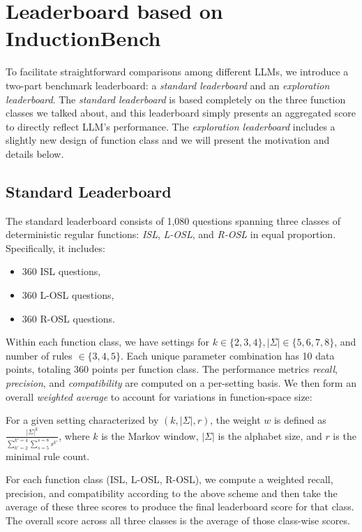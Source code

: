 \section{Leaderboard based on InductionBench}
To facilitate straightforward comparisons among different LLMs, we introduce a two-part benchmark leaderboard: a \emph{standard leaderboard} and an \emph{exploration leaderboard}. The \emph{standard leaderboard} is based completely on the three function classes we talked about, and this leaderboard simply presents an aggregated score to directly reflect LLM's performance. The \emph{exploration leaderboard} includes a slightly new design of function class and we will present the motivation and details below. 

\subsection{Standard Leaderboard}
The standard leaderboard consists of 1,080 questions spanning three classes of deterministic regular functions: \emph{ISL}, \emph{L-OSL}, and \emph{R-OSL} in equal proportion. Specifically, it includes: \begin{itemize}[leftmargin=*, itemsep=1pt] \item 360 ISL questions, \item 360 L-OSL questions, \item 360 R-OSL questions. \end{itemize}

Within each function class, we have settings for $k\in\{2, 3, 4\}, |\Sigma|\in\{5, 6, 7, 8\}$, and number of rules $\in\{3, 4, 5\}$. Each unique parameter combination has 10 data points, totaling 360 points per function class. The performance metrics \emph{recall}, \emph{precision}, and \emph{compatibility} are computed on a per-setting basis. We then form an overall \emph{weighted average} to account for variations in function-space size: 

\begin{definition}
For a given setting characterized by $(k, |\Sigma|, r)$, the weight $w$ is defined as $\frac{|\Sigma|^k}{\sum\limits_{k'=2}^{k'=4}\sum\limits_{s=5}^{s=8}s^{k'}}$, where $k$ is the Markov window, $|\Sigma|$ is the alphabet size, and $r$ is the minimal rule count.
\end{definition}

For each function class (ISL, L-OSL, R-OSL), we compute a weighted recall, precision, and compatibility according to the above scheme and then take the average of these three scores to produce the final leaderboard score for that class. The overall score across all three classes is the average of those class-wise scores.

